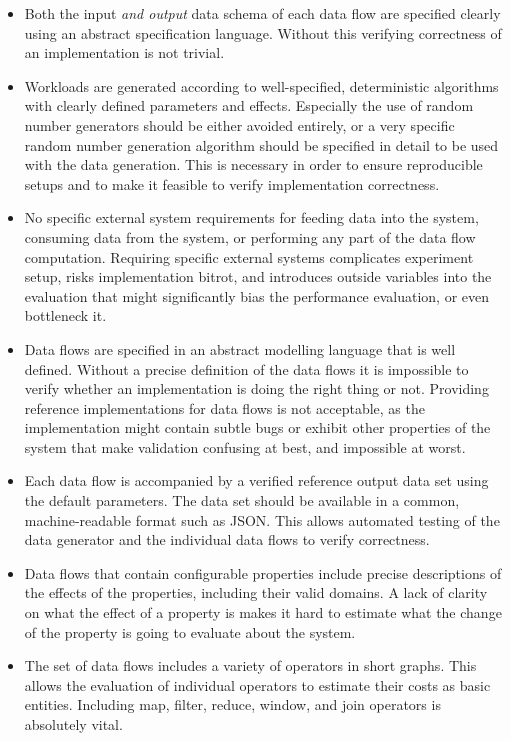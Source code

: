 \begin{itemize}
\item Both the input \textit{and output} data schema of each data flow are specified clearly using an abstract specification language. Without this verifying correctness of an implementation is not trivial.
\item Workloads are generated according to well-specified, deterministic algorithms with clearly defined parameters and effects. Especially the use of random number generators should be either avoided entirely, or a very specific random number generation algorithm should be specified in detail to be used with the data generation. This is necessary in order to ensure reproducible setups and to make it feasible to verify implementation correctness.
\item No specific external system requirements for feeding data into the system, consuming data from the system, or performing any part of the data flow computation. Requiring specific external systems complicates experiment setup, risks implementation bitrot, and introduces outside variables into the evaluation that might significantly bias the performance evaluation, or even bottleneck it.
\item Data flows are specified in an abstract modelling language that is well defined. Without a precise definition of the data flows it is impossible to verify whether an implementation is doing the right thing or not. Providing reference implementations for data flows is not acceptable, as the implementation might contain subtle bugs or exhibit other properties of the system that make validation confusing at best, and impossible at worst.
\item Each data flow is accompanied by a verified reference output data set using the default parameters. The data set should be available in a common, machine-readable format such as JSON. This allows automated testing of the data generator and the individual data flows to verify correctness.
\item Data flows that contain configurable properties include precise descriptions of the effects of the properties, including their valid domains. A lack of clarity on what the effect of a property is makes it hard to estimate what the change of the property is going to evaluate about the system.
\item The set of data flows includes a variety of operators in short graphs. This allows the evaluation of individual operators to estimate their costs as basic entities. Including map, filter, reduce, window, and join operators is absolutely vital.

\end{itemize}
